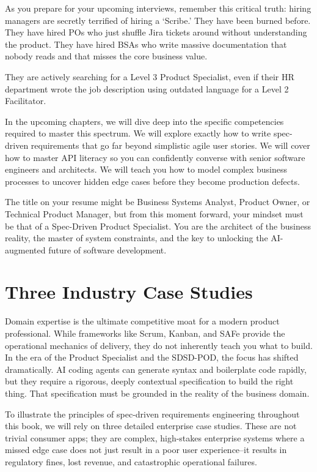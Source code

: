 \documentclass[
  11pt,
  openany,
  oneside]{book}
\begin{document}
As you prepare for your upcoming interviews, remember this critical
truth: hiring managers are secretly terrified of hiring a `Scribe.' They
have been burned before. They have hired POs who just shuffle Jira
tickets around without understanding the product. They have hired BSAs
who write massive documentation that nobody reads and that misses the
core business value.

They are actively searching for a Level 3 Product Specialist, even if
their HR department wrote the job description using outdated language
for a Level 2 Facilitator.

In the upcoming chapters, we will dive deep into the specific
competencies required to master this spectrum. We will explore exactly
how to write spec-driven requirements that go far beyond simplistic
agile user stories. We will cover how to master API literacy so you can
confidently converse with senior software engineers and architects. We
will teach you how to model complex business processes to uncover hidden
edge cases before they become production defects.

The title on your resume might be Business Systems Analyst, Product
Owner, or Technical Product Manager, but from this moment forward, your
mindset must be that of a Spec-Driven Product Specialist. You are the
architect of the business reality, the master of system constraints, and
the key to unlocking the AI-augmented future of software development.

\chapter{Three Industry Case Studies}\label{three-industry-case-studies}

Domain expertise is the ultimate competitive moat for a modern product
professional. While frameworks like Scrum, Kanban, and SAFe provide the
operational mechanics of delivery, they do not inherently teach you what
to build. In the era of the Product Specialist and the SDSD-POD, the
focus has shifted dramatically. AI coding agents can generate syntax and
boilerplate code rapidly, but they require a rigorous, deeply contextual
specification to build the right thing. That specification must be
grounded in the reality of the business domain.

To illustrate the principles of spec-driven requirements engineering
throughout this book, we will rely on three detailed enterprise case
studies. These are not trivial consumer apps; they are complex,
high-stakes enterprise systems where a missed edge case does not just
result in a poor user experience--it results in regulatory fines, lost
revenue, and catastrophic operational failures.
\end{document}
